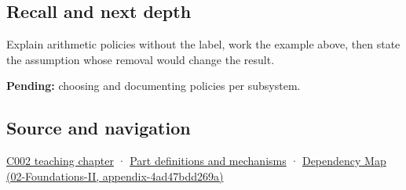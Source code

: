 \subsection{Recall and next depth}\label{recall-and-next-depth}

Explain arithmetic policies without the label, work the example above, then state the assumption whose removal would change the result.

\textbf{Pending:} choosing and documenting policies per subsystem.

\subsection{Source and navigation}\label{source-and-navigation}

\href{Continuous\%20Notes/Computing\%20Foundations\%20-\%20From\%20Bits\%20to\%20C++\%20and\%20Systems\%20APIs\#Arithmetic\%20becomes\%20a\%20policy}{C002 teaching chapter} · \hyperref[appendix-fd090d982a15]{Part definitions and mechanisms} · \href{}{Dependency Map (02-Foundations-II, appendix-4ad47bdd269a)}
